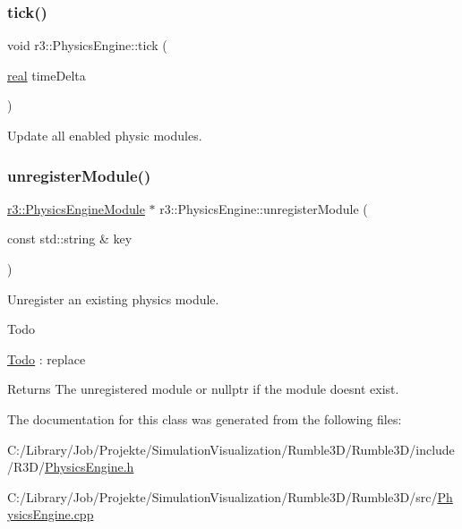 \mbox{\label{classr3_1_1_physics_engine_aba6b8345f61da6e9e1baa6c745eb1803}} 
\subsubsection{\texorpdfstring{tick()}{tick()}}
{\footnotesize\ttfamily void r3\+::\+Physics\+Engine\+::tick (\begin{DoxyParamCaption}\item[{\mbox{\hyperlink{namespacer3_ab2016b3e3f743fb735afce242f0dc1eb}{real}}}]{time\+Delta }\end{DoxyParamCaption})}



Update all enabled physic modules. 

\mbox{\label{classr3_1_1_physics_engine_a54dfdfda1b3f7eb33e9603d247f45aa8}} 
\subsubsection{\texorpdfstring{unregister\+Module()}{unregisterModule()}}
{\footnotesize\ttfamily \mbox{\hyperlink{classr3_1_1_physics_engine_module}{r3\+::\+Physics\+Engine\+Module}} $\ast$ r3\+::\+Physics\+Engine\+::unregister\+Module (\begin{DoxyParamCaption}\item[{const std\+::string \&}]{key }\end{DoxyParamCaption})}



Unregister an existing physics module. 

\begin{DoxyRefDesc}{Todo}
\item[\mbox{\hyperlink{todo__todo000007}{Todo}}]\+: replace \end{DoxyRefDesc}
\begin{DoxyReturn}{Returns}
The unregistered module or nullptr if the module doesn\textquotesingle{}t exist. 
\end{DoxyReturn}


The documentation for this class was generated from the following files\+:\begin{DoxyCompactItemize}
\item 
C\+:/\+Library/\+Job/\+Projekte/\+Simulation\+Visualization/\+Rumble3\+D/\+Rumble3\+D/include/\+R3\+D/\mbox{\hyperlink{_physics_engine_8h}{Physics\+Engine.\+h}}\item 
C\+:/\+Library/\+Job/\+Projekte/\+Simulation\+Visualization/\+Rumble3\+D/\+Rumble3\+D/src/\mbox{\hyperlink{_physics_engine_8cpp}{Physics\+Engine.\+cpp}}\end{DoxyCompactItemize}
